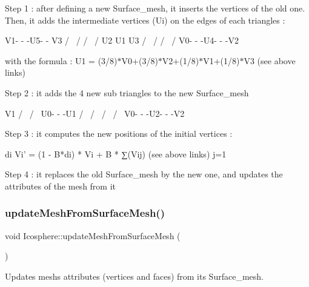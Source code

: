 Step 1 \+: after defining a new Surface\+\_\+mesh, it inserts the vertices of the old one. Then, it adds the intermediate vertices (Ui) on the edges of each triangles \+: \begin{DoxyVerb}                V1- - -U5- - V3
               /  \         /
              /    \       /
             U2     U1    U3
            /        \   /
           /          \ /
         V0- - -U4- - -V2
\end{DoxyVerb}


with the formula \+: U1 = (3/8)$\ast$\+V0+(3/8)$\ast$\+V2+(1/8)$\ast$\+V1+(1/8)$\ast$\+V3 (see above links)

Step 2 \+: it adds the 4 new sub triangles to the new Surface\+\_\+mesh \begin{DoxyVerb}                          V1
                         /  \
                        /    \
                       U0- - -U1
                      /  \   / \
                     /    \ /   \
                   V0- - -U2- - -V2
\end{DoxyVerb}


Step 3 \+: it computes the new positions of the initial vertices \+: \begin{DoxyVerb}                                 di
     Vi' = (1 - B*di) * Vi + B * ∑(Vij)   (see above links)
                                j=1
\end{DoxyVerb}


Step 4 \+: it replaces the old Surface\+\_\+mesh by the new one, and updates the attributes of the mesh from it \mbox{\label{class_icosphere_a38645b095ea6895c2aa5bbff7d8edf20}} 
\subsubsection{\texorpdfstring{update\+Mesh\+From\+Surface\+Mesh()}{updateMeshFromSurfaceMesh()}}
{\footnotesize\ttfamily void Icosphere\+::update\+Mesh\+From\+Surface\+Mesh (\begin{DoxyParamCaption}{ }\end{DoxyParamCaption})}



Updates mesh\textquotesingle{}s attributes (vertices and faces) from its Surface\+\_\+mesh. 



